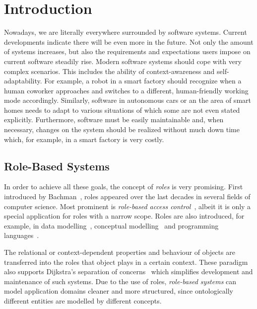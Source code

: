 
\chapter{Introduction}
\label{ch:introduction}

Nowadays, we are literally everywhere surrounded by software systems. Current developments indicate
there will be even more in the future.  Not only the amount of systems increases, but also the
requirements and expectations users impose on current software steadily rise. Modern software
systems should cope with very complex scenarios. This includes the ability of context-awareness and
self-adaptability. For example, a robot in a smart factory should recognize when a human coworker
approaches and switches to a different, human-friendly working mode accordingly. Similarly, software
in autonomous cars or an the area of smart homes needs to adapt to various situations of which some
are not even stated explicitly.
%
Furthermore, software must be easily maintainable and, when necessary, changes on the system should be realized
without much down time which, for example, in a smart factory is very costly. 

\section{Role-Based Systems}
\label{sec:intro-role-based-systems}

In order to achieve all these goals, the concept of \emph{roles} is very promising. First introduced
by Bachman~\cite{BaD-VLDB77}, roles appeared over the last decades in several fields of computer
science. Most prominent is \emph{role-based access
  control}~\cite{FeKC-RBAC03,AlFe-ECS11,SaCF-IEEE96}, albeit it is only a special application for
roles with a narrow scope. Roles are also introduced, for example, in data
modelling~\cite{Ha-ORM2006}, conceptual modelling~\cite{Stei-DKE00,Gui-PHD05,Stei-AO07} and
programming languages~\cite{BaBT-SAC06,Herr-AO07,BaGE-ECOOP07}.

The relational or context-dependent properties and behaviour of objects are transferred into the
roles that object plays in a certain context. These paradigm also supports Dijkstra's separation of
concerns~\cite{Dij-SelWrCom82} which simplifies development and maintenance of such systems.  Due to
the use of roles, \emph{role-based systems} can model application domains cleaner and more
structured, since ontologically different entities are modelled by different concepts.

